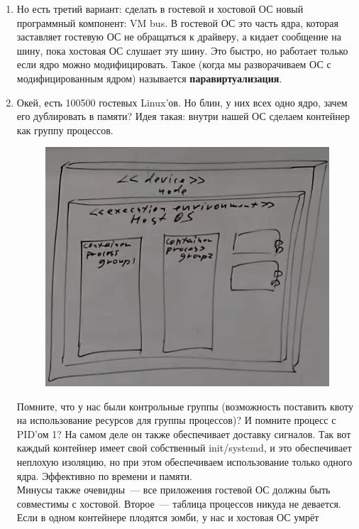 \documentclass{article}
\begin{document}
\begin{enumerate}
        \item Но есть третий вариант: сделать в гостевой и хостовой ОС новый программный компонент: VM bus. В гостевой ОС это часть ядра, которая заставляет гостевую ОС не обращаться к драйверу, а кидает сообщение на шину, пока хостовая ОС слушает эту шину. Это быстро, но работает только если ядро можно модифицировать. Такое (когда мы разворачиваем ОС с модифицированным ядром) называется \textbf{паравиртуализация}.
        \item Окей, есть 100500 гостевых Linux'ов. Но блин, у них всех одно ядро, зачем его дублировать в памяти? Идея такая: внутри нашей ОС сделаем контейнер как группу процессов.
        \begin{figure}[H]
            \centering
            \includegraphics[width=0.7\linewidth]{Images/screenshot003}
        \end{figure}\noindent
        Помните, что у нас были контрольные группы (возможность поставить квоту на использование ресурсов для группы процессов)? И помните процесс с PID'ом 1? На самом деле он также обеспечивает доставку сигналов. Так вот каждый контейнер имеет свой собственный init/systemd, и это обеспечивает неплохую изоляцию, но при этом обеспечиваем использование только одного ядра. Эффективно по времени и памяти.\\
        Минусы также очевидны~--- все приложения гостевой ОС должны быть совместимы с хостовой. Второе~--- таблица процессов никуда не девается. Если в одном контейнере плодятся зомби, у нас и хостовая ОС умрёт
    \end{enumerate}
\end{document}
